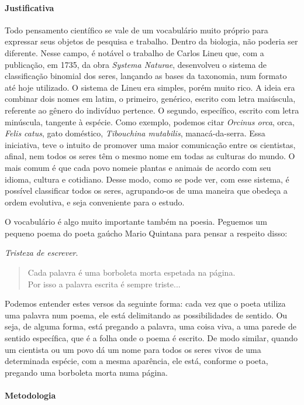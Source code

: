 \documentclass[11pt]{extarticle}
\begin{document}
\paragraph{Justificativa} Todo pensamento científico se vale de um vocabulário muito próprio para
expressar seus objetos de pesquisa e trabalho. Dentro da biologia, não poderia
ser diferente. Nesse campo, é notável o trabalho de Carlos Lineu que, com
a publicação, em 1735, da obra \emph{Systema Naturae}, desenvolveu o sistema de
classificação binomial dos seres, lançando as bases da taxonomia, num formato
até hoje utilizado. O sistema de Lineu era simples, porém muito rico. A ideia
era combinar dois nomes em latim, o primeiro, genérico, escrito com letra
maiúscula, referente ao gênero do indivíduo pertence. O segundo, específico,
escrito com letra minúscula, tangente à espécie. Como exemplo, podemos citar
\emph{Orcinus orca}, orca, \emph{Felis catus}, gato doméstico, \emph{Tibouchina
mutabilis}, manacá-da-serra. Essa iniciativa, teve o intuito de promover uma
maior comunicação entre os cientistas, afinal, nem todos os seres têm o mesmo
nome em todas as culturas do mundo. O mais comum é que cada povo nomeie plantas
e animais de acordo com seu idioma, cultura e cotidiano. Desse modo, como se
pode ver, com esse sistema, é possível classificar todos os seres, agrupando-os
de uma maneira que obedeça a ordem evolutiva, e seja conveniente para o estudo.

O vocabulário é algo muito importante também na poesia. 
Peguemos um pequeno poema do poeta gaúcho Mario Quintana para pensar a respeito disso: 


\textit{Tristeza de escrever}.

\begin{verse}
Cada palavra é uma borboleta morta espetada na página.\\
Por isso a palavra escrita é sempre triste...
\end{verse}


Podemos entender estes versos da seguinte forma: cada vez que o poeta
utiliza uma palavra num poema, ele está delimitando as possibilidades
de sentido. Ou seja, de alguma forma, está pregando a palavra, uma coisa
viva, a uma parede de sentido específica, que é a folha onde o poema é 
escrito. De modo similar, quando um cientista ou um povo dá um nome para todos os 
seres vivos de uma determinada espécie, com a mesma aparência, ele está, conforme
o poeta, pregando uma borboleta morta numa página. 

\paragraph{Metodologia}
\end{document}
